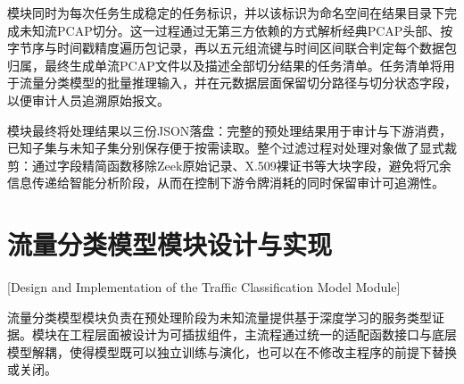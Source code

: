 \begin{algorithm}[h]
	\caption{已知流量过滤判别流程}\label{alg:ch4-classify}
	
\end{algorithm}

模块同时为每次任务生成稳定的任务标识，并以该标识为命名空间在结果目录下完成未知流PCAP切分。这一过程通过无第三方依赖的方式解析经典PCAP头部、按字节序与时间戳精度遍历包记录，再以五元组流键与时间区间联合判定每个数据包归属，最终生成单流PCAP文件以及描述全部切分结果的任务清单。任务清单将用于流量分类模型的批量推理输入，并在元数据层面保留切分路径与切分状态字段，以便审计人员追溯原始报文。

模块最终将处理结果以三份JSON落盘：完整的预处理结果用于审计与下游消费，已知子集与未知子集分别保存便于按需读取。整个过滤过程对处理对象做了显式裁剪：通过字段精简函数移除Zeek原始记录、X.509裸证书等大块字段，避免将冗余信息传递给智能分析阶段，从而在控制下游令牌消耗的同时保留审计可追溯性。

\section{流量分类模型模块设计与实现}[Design and Implementation of the Traffic Classification Model Module]

流量分类模型模块负责在预处理阶段为未知流量提供基于深度学习的服务类型证据。模块在工程层面被设计为可插拔组件，主流程通过统一的适配函数接口与底层模型解耦，使得模型既可以独立训练与演化，也可以在不修改主程序的前提下替换或关闭。

